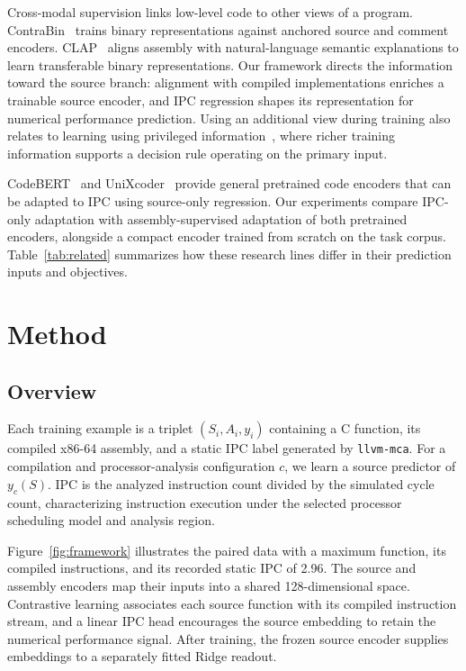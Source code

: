 \documentclass[conference]{IEEEtran}
\newcommand{\llvmmca}{\texttt{llvm-mca}}
\begin{document}
Cross-modal supervision links low-level code to other views of a program. ContraBin~\cite{zhang2022pre} trains binary representations against anchored source and comment encoders. CLAP~\cite{wang2024clap} aligns assembly with natural-language semantic explanations to learn transferable binary representations. Our framework directs the information toward the source branch: alignment with compiled implementations enriches a trainable source encoder, and IPC regression shapes its representation for numerical performance prediction. Using an additional view during training also relates to learning using privileged information~\cite{vapnik2015privileged}, where richer training information supports a decision rule operating on the primary input.

CodeBERT~\cite{feng2020codebert} and UniXcoder~\cite{unixcoder2022} provide general pretrained code encoders that can be adapted to IPC using source-only regression. Our experiments compare IPC-only adaptation with assembly-supervised adaptation of both pretrained encoders, alongside a compact encoder trained from scratch on the task corpus. Table~\ref{tab:related} summarizes how these research lines differ in their prediction inputs and objectives.


\section{Method}
\subsection{Overview}
Each training example is a triplet $(S_i,A_i,y_i)$ containing a C function, its compiled x86-64 assembly, and a static IPC label generated by \llvmmca{}. For a compilation and processor-analysis configuration $c$, we learn a source predictor of $y_c(S)$. IPC is the analyzed instruction count divided by the simulated cycle count, characterizing instruction execution under the selected processor scheduling model and analysis region.

Figure~\ref{fig:framework} illustrates the paired data with a maximum function, its compiled instructions, and its recorded static IPC of 2.96. The source and assembly encoders map their inputs into a shared 128-dimensional space. Contrastive learning associates each source function with its compiled instruction stream, and a linear IPC head encourages the source embedding to retain the numerical performance signal. After training, the frozen source encoder supplies embeddings to a separately fitted Ridge readout.
\end{document}
